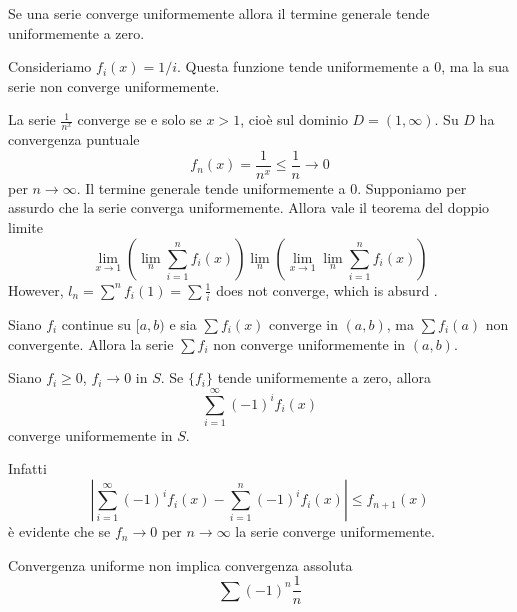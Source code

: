 \documentclass[a4paper]{article}
\begin{document}
\begin{snippetproposition}{}
    Se una serie converge uniformemente allora il termine generale tende uniformemente a zero.
\end{snippetproposition}

\begin{snippetexercise}{}
    Consideriamo \(f_i(x) = 1/i\). Questa funzione tende uniformemente a \(0\),
    ma la sua serie non converge uniformemente.
\end{snippetexercise}

\begin{snippetexercise}{}
    La serie \(\frac{1}{n^x}\) converge se e solo se \(x>1\), cioè sul dominio \(D = (1, \infty)\).
    Su \(D\) ha convergenza puntuale
    \[
        f_n(x) = \frac{1}{n^x} \leq \frac{1}{n} \to 0
    \]
    per \(n \to \infty\).
    Il termine generale tende uniformemente a \(0\).
    Supponiamo per assurdo che la serie converga uniformemente. Allora vale il teorema del doppio limite
    \[
        \lim_{x\to 1}
        \left(
            \lim_n \sum_{i=1}^n f_i(x)
        \right)
        \lim_n \left(
            \lim_{x\to 1}\lim_n \sum_{i=1}^n f_i(x)
        \right)
    \]
    However, \(l_n = \sum^n f_i(1) = \sum \frac1i\) does not converge, which is absurd \lightning.
\end{snippetexercise}

\begin{snippetproposition}{}
    Siano \(f_i\) continue su \([a,b)\) e sia \(\sum f_i(x)\) converge in \((a,b)\),
    ma \(\sum f_i(a)\) non convergente.
    Allora la serie \(\sum f_i\) non converge uniformemente in \((a,b)\).
\end{snippetproposition}

\begin{snippetproposition}{}
    Siano \(f_i \geq 0\), \(f_i \to 0\) in \(S\).
    Se \(\{f_i\}\) tende uniformemente a zero, allora
    \[
        \sum_{i=1}^\infty {(-1)}^i f_i(x)
    \]
    converge uniformemente in \(S\).
\end{snippetproposition}

\begin{snippetproof}{}
    Infatti
    \[
        \left|
            \sum_{i=1}^\infty {(-1)}^i f_i(x)-
            \sum_{i=1}^n {(-1)}^i f_i(x)
        \right| \leq f_{n+1}(x)
    \]
    è evidente che se \(f_n \to 0\) per \(n\to\infty\) la serie converge uniformemente.
\end{snippetproof}

\begin{snippetexample}{Convergenza uniforme non implica convergenza assoluta}
    \[
        \sum {(-1)}^n \frac1n
    \]
\end{snippetexample}
\end{document}
